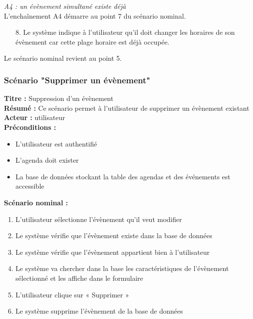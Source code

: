 \documentclass[12pt , a4paper]{article}
\begin{document}
\noindent\textit{A4 : un évènement simultané existe déjà}\\
L’enchaînement A4 démarre au point 7 du scénario nominal.
\begin{enumerate}
\item[8.] Le système indique à l’utilisateur qu’il doit changer les horaires de son évènement car cette plage horaire est déjà occupée.
\end{enumerate}
Le scénario nominal revient au point 5.\\





\subsubsection{Scénario "Supprimer un évènement"}
\noindent\textbf{Titre : } Suppression d’un évènement\\
\textbf{Résumé : } Ce scénario permet à l’utilisateur de supprimer un évènement existant\\
\textbf{Acteur : }utilisateur\\

\noindent\textbf{Préconditions :}
\begin{itemize}
\item L’utilisateur est authentifié
\item L'agenda doit exister
\item La base de données stockant la table des agendas et des événements est accessible\\
\end{itemize}


\noindent\textbf{Scénario nominal :}
\begin{enumerate}
\item L’utilisateur sélectionne l’évènement qu’il veut modifier
\item Le système vérifie que l’évènement existe dans la base de données
\item Le système vérifie que l’évènement appartient bien à l’utilisateur
\item Le système va chercher dans la base les caractéristiques de l’évènement sélectionné et les affiche dans le formulaire
\item L’utilisateur clique sur « Supprimer »
\item Le système supprime l’évènement  de la base de données\\
\end{enumerate}
\end{document}

